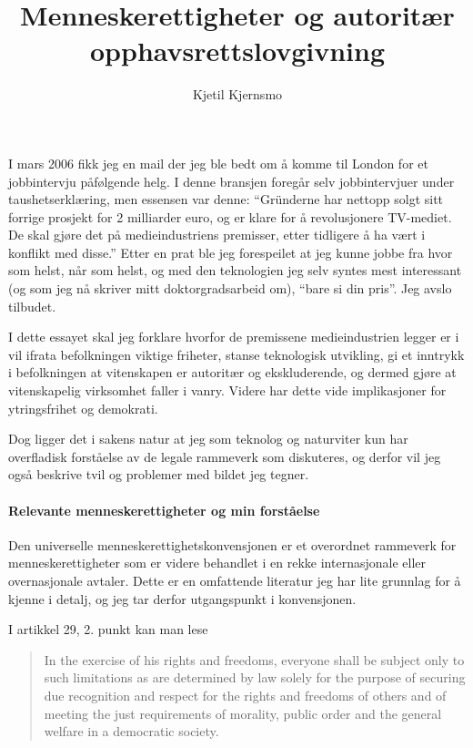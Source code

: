\documentclass[11pt,norsk,a4paper]{article}
\title{Menneskerettigheter og autoritær opphavsrettslovgivning}
\author{Kjetil Kjernsmo}
\begin{document}
\maketitle

I mars 2006 fikk jeg en mail der jeg ble bedt om å komme til London
for et jobbintervju påfølgende helg. I denne bransjen foregår selv
jobbintervjuer under taushetserklæring, men essensen var denne:
``Gründerne har nettopp solgt sitt forrige prosjekt for 2 milliarder
euro, og er klare for å revolusjonere TV-mediet. De skal gjøre det på
medieindustriens premisser, etter tidligere å ha vært i konflikt med
disse.'' Etter en prat ble jeg forespeilet at jeg kunne jobbe fra hvor
som helst, når som helst, og med den teknologien jeg selv syntes mest
interessant (og som jeg nå skriver mitt doktorgradsarbeid om), ``bare
si din pris''. Jeg avslo tilbudet.

I dette essayet skal jeg forklare hvorfor de premissene
medieindustrien legger er i vil ifrata befolkningen viktige friheter,
stanse teknologisk utvikling, gi et inntrykk i befolkningen at
vitenskapen er autoritær og ekskluderende, og dermed gjøre at
vitenskapelig virksomhet faller i vanry. Videre har dette vide
implikasjoner for ytringsfrihet og demokrati. 

Dog ligger det i sakens natur at jeg som teknolog og naturviter kun
har overfladisk forståelse av de legale rammeverk som diskuteres, og
derfor vil jeg også beskrive tvil og problemer med bildet jeg tegner.

\paragraph{Relevante menneskerettigheter og min forståelse}

Den universelle menneskerettighetskonvensjonen\cite{udhr} er et
overordnet rammeverk for menneskerettigheter som er videre behandlet i
en rekke internasjonale eller overnasjonale avtaler. Dette er en
omfattende literatur jeg har lite grunnlag for å kjenne i detalj, og
jeg tar derfor utgangspunkt i konvensjonen.

I artikkel 29, 2. punkt kan man lese  
\begin{quote}
In the exercise of his rights and freedoms, everyone shall be subject
only to such limitations as are determined by law solely for the
purpose of securing due recognition and respect for the rights and
freedoms of others and of meeting the just requirements of morality,
public order and the general welfare in a democratic society.
\end{quote}
\end{document}

